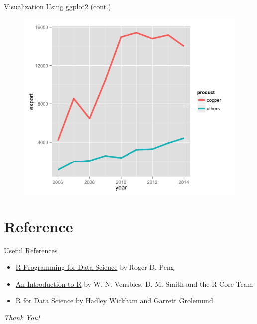 \documentclass{beamer}
\begin{document}
\begin{frame}[fragile]{Visualization Using ggplot2 (cont.)}
\begin{figure}
\begin{minipage}{.5\textwidth}
  \label{fig:test1}
\end{minipage}%
\begin{minipage}{.5\textwidth}
  \centering
  \includegraphics[width=.7\linewidth]{eg_line.png}
  \label{fig:test2}
\end{minipage}
\end{figure}

\end{frame}


\section{Reference}

\begin{frame}{Useful References}
\begin{itemize}
    \item \href{https://bookdown.org/rdpeng/rprogdatascience/}{R Programming for Data Science} by Roger D. Peng
    \item \href{https://cran.r-project.org/doc/manuals/r-release/R-intro.pdf}{An Introduction to R} by W. N. Venables, D. M. Smith and the R Core Team
    \item \href{https://r4ds.had.co.nz/index.html}{R for Data Science} by Hadley Wickham and Garrett Grolemund
\end{itemize}
\end{frame}

\begin{frame}{}
\centering \Huge
\emph{Thank You!}
\end{frame}
\end{document}
